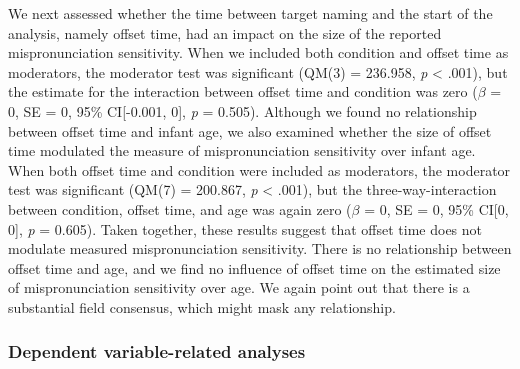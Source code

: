 \documentclass[man]{apa6}
\theoremstyle{definition}
\theoremstyle{definition}
\theoremstyle{definition}
\theoremstyle{remark}
\begin{document}
We next assessed whether the time between target naming and the start of
the analysis, namely offset time, had an impact on the size of the
reported mispronunciation sensitivity. When we included both condition
and offset time as moderators, the moderator test was significant (QM(3)
= 236.958, \emph{p} \textless{} .001), but the estimate for the
interaction between offset time and condition was zero (\(\beta\) = 0,
SE = 0, 95\% CI{[}-0.001, 0{]}, \emph{p} = 0.505). Although we found no
relationship between offset time and infant age, we also examined
whether the size of offset time modulated the measure of
mispronunciation sensitivity over infant age. When both offset time and
condition were included as moderators, the moderator test was
significant (QM(7) = 200.867, \emph{p} \textless{} .001), but the
three-way-interaction between condition, offset time, and age was again
zero (\(\beta\) = 0, SE = 0, 95\% CI{[}0, 0{]}, \emph{p} = 0.605). Taken
together, these results suggest that offset time does not modulate
measured mispronunciation sensitivity. There is no relationship between
offset time and age, and we find no influence of offset time on the
estimated size of mispronunciation sensitivity over age. We again point
out that there is a substantial field consensus, which might mask any
relationship.

\subsubsection{Dependent variable-related
analyses}\label{dependent-variable-related-analyses}
\end{document}
